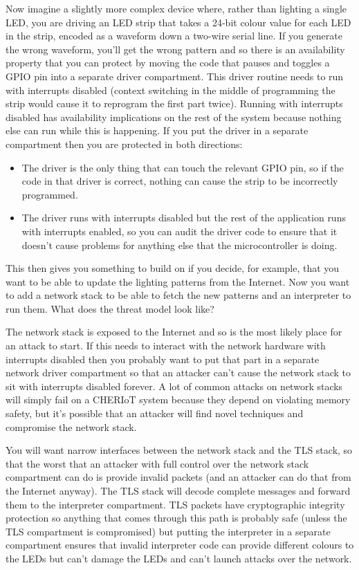 Now imagine a slightly more complex device where, rather than lighting a single LED, you are driving an LED strip that takes a 24-bit colour value for each LED in the strip, encoded as a waveform down a two-wire serial line.
If you generate the wrong waveform, you'll get the wrong pattern and so there is an availability property that you can protect by moving the code that pauses and toggles a GPIO pin into a separate driver compartment.
This driver routine needs to run with interrupts disabled (context switching in the middle of programming the strip would cause it to reprogram the first part twice).
Running with interrupts disabled has availability implications on the rest of the system because nothing else can run while this is happening.
If you put the driver in a separate compartment then you are protected in both directions:

\begin{itemize}
	\item{The driver is the only thing that can touch the relevant GPIO pin, so if the code in that driver is correct, nothing can cause the strip to be incorrectly programmed.}
	\item{The driver runs with interrupts disabled but the rest of the application runs with interrupts enabled, so you can audit the driver code to ensure that it doesn't cause problems for anything else that the microcontroller is doing.}
\end{itemize}

This then gives you something to build on if you decide, for example, that you want to be able to update the lighting patterns from the Internet.
Now you want to add a network stack to be able to fetch the new patterns and an interpreter to run them.
What does the threat model look like?

The network stack is exposed to the Internet and so is the most likely place for an attack to start.
If this needs to interact with the network hardware with interrupts disabled then you probably want to put that part in a separate network driver compartment so that an attacker can't cause the network stack to sit with interrupts disabled forever.
A lot of common attacks on network stacks will simply fail on a CHERIoT system because they depend on violating memory safety, but it's possible that an attacker will find novel techniques and compromise the network stack.

You will want narrow interfaces between the network stack and the TLS stack, so that the worst that an attacker with full control over the network stack compartment can do is provide invalid packets (and an attacker can do that from the Internet anyway).
The TLS stack will decode complete messages and forward them to the interpreter compartment.
TLS packets have cryptographic integrity protection so anything that comes through this path is probably safe (unless the TLS compartment is compromised) but putting the interpreter in a separate compartment ensures that invalid interpreter code can provide different colours to the LEDs but can't damage the LEDs and can't launch attacks over the network.


